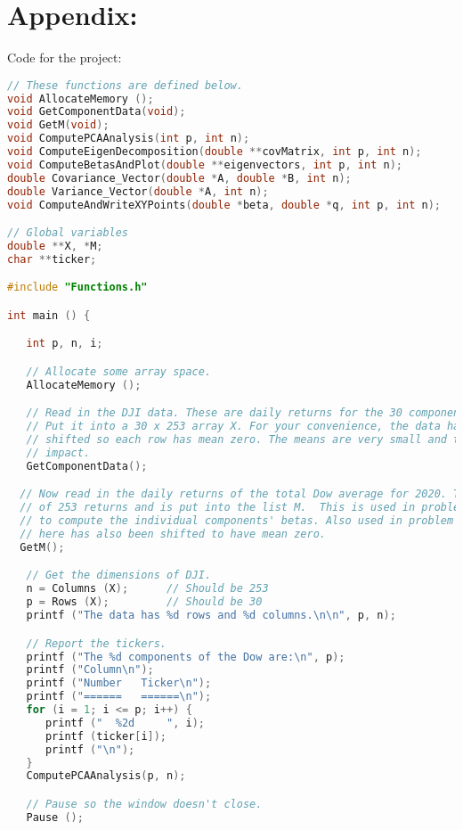 \documentclass{report}
\begin{document}
\setcounter{page}{10}



\section*{Appendix:}


Code for the project:
\begin{lstlisting}[language=c++]
// These functions are defined below.
void AllocateMemory ();
void GetComponentData(void);
void GetM(void);
void ComputePCAAnalysis(int p, int n);
void ComputeEigenDecomposition(double **covMatrix, int p, int n);
void ComputeBetasAndPlot(double **eigenvectors, int p, int n);
double Covariance_Vector(double *A, double *B, int n);
double Variance_Vector(double *A, int n);
void ComputeAndWriteXYPoints(double *beta, double *q, int p, int n); 

// Global variables
double **X, *M;
char **ticker;

#include "Functions.h"

int main () {

   int p, n, i;

   // Allocate some array space.
   AllocateMemory ();

   // Read in the DJI data. These are daily returns for the 30 components for 2020.
   // Put it into a 30 x 253 array X. For your convenience, the data has already been
   // shifted so each row has mean zero. The means are very small and this has minimal
   // impact.
   GetComponentData();

  // Now read in the daily returns of the total Dow average for 2020. This is a list
  // of 253 returns and is put into the list M.  This is used in problem 3
  // to compute the individual components' betas. Also used in problem 4. The data
  // here has also been shifted to have mean zero.
  GetM();

   // Get the dimensions of DJI.
   n = Columns (X);      // Should be 253
   p = Rows (X);         // Should be 30
   printf ("The data has %d rows and %d columns.\n\n", p, n);

   // Report the tickers.
   printf ("The %d components of the Dow are:\n", p);
   printf ("Column\n");
   printf ("Number   Ticker\n");
   printf ("======   ======\n");
   for (i = 1; i <= p; i++) {
      printf ("  %2d     ", i);
      printf (ticker[i]);
      printf ("\n");
   }
   ComputePCAAnalysis(p, n);

   // Pause so the window doesn't close.
   Pause ();


\end{lstlisting}
\end{document}
